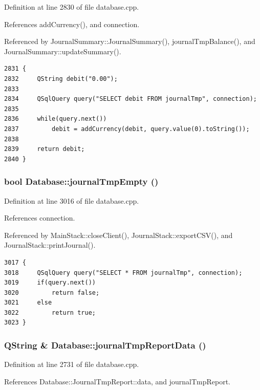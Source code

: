 Definition at line 2830 of file database.cpp.

References add\-Currency(), and connection.

Referenced by Journal\-Summary::Journal\-Summary(), journal\-Tmp\-Balance(), and Journal\-Summary::update\-Summary().

\footnotesize\begin{verbatim}2831 {
2832     QString debit("0.00");
2833     
2834     QSqlQuery query("SELECT debit FROM journalTmp", connection);
2835     
2836     while(query.next())
2837         debit = addCurrency(debit, query.value(0).toString());
2838     
2839     return debit;
2840 }
\end{verbatim}\normalsize 


\hypertarget{classDatabase_a51}{
\subsubsection[journalTmpEmpty]{\setlength{\rightskip}{0pt plus 5cm}bool Database::journal\-Tmp\-Empty ()}}
\label{classDatabase_a51}


Definition at line 3016 of file database.cpp.

References connection.

Referenced by Main\-Stack::close\-Client(), Journal\-Stack::export\-CSV(), and Journal\-Stack::print\-Journal().

\footnotesize\begin{verbatim}3017 {
3018     QSqlQuery query("SELECT * FROM journalTmp", connection);
3019     if(query.next())
3020         return false;
3021     else
3022         return true;
3023 }
\end{verbatim}\normalsize 


\hypertarget{classDatabase_a35}{
\subsubsection[journalTmpReportData]{\setlength{\rightskip}{0pt plus 5cm}QString \& Database::journal\-Tmp\-Report\-Data ()}}
\label{classDatabase_a35}


Definition at line 2731 of file database.cpp.

References Database::Journal\-Tmp\-Report::data, and journal\-Tmp\-Report.

